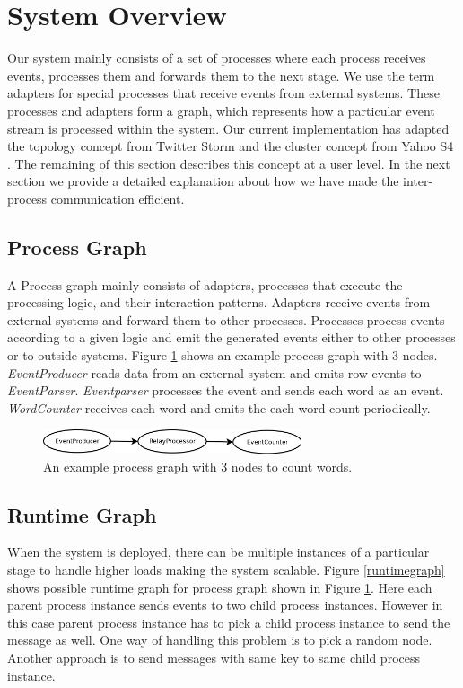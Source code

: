 \section{System Overview}
Our system mainly consists of a set of processes where each process receives events, processes them and forwards them to the next stage. We use the term adapters for special processes that receive events from external systems. These processes and adapters form a graph, which represents how a particular event stream is processed within the system. Our current implementation has adapted the topology concept from Twitter Storm \cite{toshniwal2014storm} and the cluster concept from Yahoo S4 \cite{neumeyer2010s4}. The remaining of this section describes this concept at a user level. In the next section we provide a detailed explanation about how we have made the inter-process communication efficient. 
\subsection{Process Graph}
A Process graph mainly consists of adapters, processes that execute the processing logic, and their interaction patterns. Adapters receive events from external systems and forward them to other processes. Processes process events according to a given logic and emit the generated events either to other processes or to outside systems. Figure \ref{processgraph} shows an example process graph with 3 nodes. \textit{EventProducer} reads data from an external system and emits row events to \textit{EventParser}. \textit{Eventparser} processes the event and sends each word as an event. \textit{WordCounter} receives each word and emits the each word count periodically. 

\begin{figure}[!t]
	\centering
	\includegraphics[width=3.0in]{processgraph.png}
	\caption{An example process graph with 3 nodes to count words.}
	\label{processgraph}
\end{figure}

\subsection{Runtime Graph}
When the system is deployed, there can be multiple instances of a particular stage to handle higher loads making the system scalable. Figure \ref{runtimegraph} shows possible runtime graph for process graph shown in Figure \ref{processgraph}. Here each parent process instance sends events to two child process instances. However in this case parent process instance has to pick a child process instance to send the message as well. One way of handling this problem is to pick a random node. Another approach is to send messages with same key to same child process instance. 

